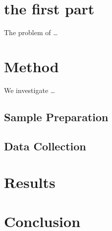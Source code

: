 \documentclass[]{article}
\begin{document}
\section{the first part}

The problem of \ldots

\section{Method}

We investigate \ldots

\subsection{Sample Preparation}

\subsection{Data Collection}

\section{Results}

\section{Conclusion}
\end{document}
